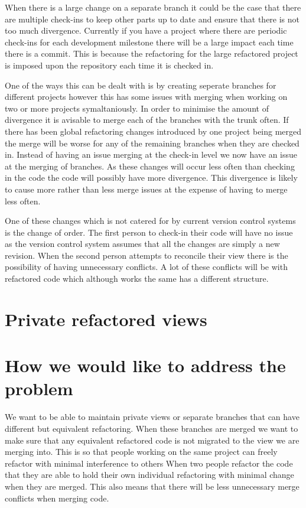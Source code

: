 When there is a large change on a separate branch it could be the case that there are multiple check-ins to keep other parts up to date and ensure that there is not too much divergence.  Currently if you have a project where there are periodic check-ins for each development milestone there will be a large impact each time there is a commit. This is because the refactoring for the large refactored project is imposed upon the repository each time it is checked in.

One of the ways this can be dealt with is by creating seperate branches for different projects however this has some issues with merging when working on two or more projects symaltaniously.  In order to minimise the amount of divergence it is avisable to merge each of the branches with the trunk often.  If there has been global refactoring changes introduced by one project being merged the merge will be worse for any of the remaining branches when they are checked in.  Instead of having an issue merging at the check-in level we now have an issue at the merging of branches.  As these changes will occur less often than checking in the code the code will possibly have more divergence.  This divergence is likely to cause more rather than less merge issues at the expense of having to merge less often.


One of these changes which is not catered for by current version control systems is the change of order.  The first person to check-in their code will have no issue as the version control system assumes that all the changes are simply a new revision.  When the second person attempts to reconcile their view there is the possibility of having unnecessary conflicts.  A lot of these conflicts will be with refactored code which although works the same has a different structure.

\section{Private refactored views}




% 
% 

\section{How we would like to address the problem}
We want to be able to maintain private views or separate branches that can have different but equivalent refactoring.  When these branches are merged we want to make sure that any equivalent refactored code is not migrated to the view we are merging into.
This is so that people working on the same project can freely refactor with minimal interference to others
When two people refactor the code that they are able to hold their own individual refactoring with minimal change when they are merged.
This also means that there will be less unnecessary merge conflicts when merging code.

